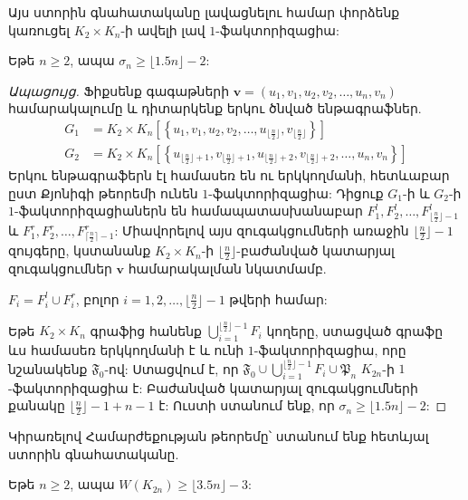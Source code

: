 Այս ստորին գնահատականը լավացնելու համար փորձենք կառուցել $K_2 \times K_n$-ի ավելի լավ $1$-ֆակտորիզացիա:

\begin{lemma}\label{l35n3}
Եթե $n \geq 2$, ապա $\sigma_n \geq \lfloor 1.5n \rfloor - 2$:
\end{lemma}
\begin{proof}[Ապացույց]
Ֆիքսենք գագաթների $\mathbf{v} = \left(u_1,v_1,u_2,v_2,\ldots,u_n,v_n\right)$ համարակալումը և դիտարկենք երկու ծնված ենթագրաֆներ.
\begin{align*}
G_1 &= K_2 \times K_n\left[\left\{u_1,v_1,u_2,v_2,\ldots,u_{\lfloor\frac{n}{2}\rfloor},v_{\lfloor\frac{n}{2}\rfloor}\right\}\right]\\ 
G_2 &= K_2 \times K_n\left[\left\{u_{\lfloor\frac{n}{2}\rfloor + 1},v_{\lfloor\frac{n}{2}\rfloor + 1},
u_{\lfloor\frac{n}{2}\rfloor + 2},v_{\lfloor\frac{n}{2}\rfloor + 2},\ldots,u_n,v_n \right\}\right]
\end{align*}
Երկու ենթագրաֆերն էլ համասեռ են ու երկկողմանի, հետևաբար ըստ Քյոնիգի թեորեմի \cite{Konig1916} ունեն $1$-ֆակտորիզացիա: Դիցուք $G_1$-ի և $G_2$-ի $1$-ֆակտորիզացիաներն են համապատասխանաբար $F^l_1,F^l_2,\ldots,F^l_{\lfloor\frac{n}{2}\rfloor-1}$ և $F^r_1,F^r_2,\ldots,F^r_{\lceil\frac{n}{2}\rceil-1}$: Միավորելով այս զուգակցումների առաջին $\lfloor\frac{n}{2}\rfloor-1$ զույգերը, կստանանք $K_2 \times K_n$-ի $\lfloor\frac{n}{2}\rfloor$-բաժանված կատարյալ զուգակցումներ $\mathbf{v}$ համարակալման նկատմամբ.

\begin{center}
$F_i = F^l_i \cup F^r_i$, բոլոր $i=1,2,\ldots,\lfloor\frac{n}{2}\rfloor - 1$ թվերի համար:
\end{center}

Եթե $K_2 \times K_n$ գրաֆից հանենք $\bigcup\limits_{i=1}^{\lfloor\frac{n}{2}\rfloor-1}F_i$ կողերը, ստացված գրաֆը ևս համասեռ երկկողմանի է և ունի $1$-ֆակտորիզացիա, որը նշանակենք $\mathfrak{F}_0$-ով: Ստացվում է, որ $\mathfrak{F}_0 \cup \bigcup\limits_{i=1}^{\lfloor\frac{n}{2}\rfloor-1}F_i \cup \mathfrak{P}_n$ $K_{2n}$-ի $1$-ֆակտորիզացիա է: Բաժանված կատարյալ զուգակցումների քանակը $\lfloor\frac{n}{2}\rfloor - 1 + n - 1$ է: Ուստի ստանում ենք, որ $\sigma_n \geq \lfloor 1.5n \rfloor - 2$:
\end{proof}

Կիրառելով Համարժեքության թեորեմը՝ ստանում ենք հետևյալ ստորին գնահատականը.
\begin{theorem}
\label{t35n3}
Եթե $n \geq 2$, ապա $W(K_{2n}) \geq \lfloor 3.5n \rfloor - 3$:
\end{theorem}


